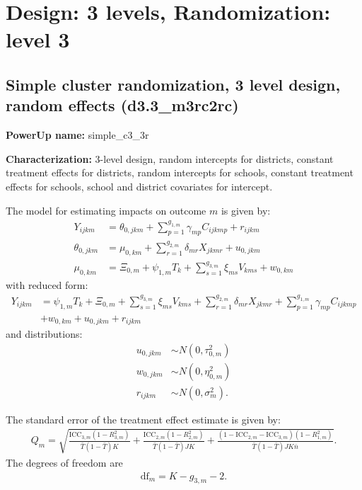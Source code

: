 \documentclass[12pt]{article}
\begin{document}
\section{Design: 3 levels, Randomization: level 3}


\subsection{Simple cluster randomization, 3 level design, random effects (d3.3\_m3rc2rc)}

\textbf{PowerUp name:} simple\_c3\_3r

\textbf{Characterization:} 3-level design, random intercepts for districts, constant treatment effects for districts, random intercepts for schools, constant treatment effects for schools, school and district covariates for intercept.

The model for estimating impacts on outcome $m$ is given by:
\begin{align}\label{eqn:bi12c_model}
Y_{ijkm} &=  \theta_{0,jkm} + \sum_{p=1}^{g_{1,m}} \gamma_{mp} C_{ijkmp} + r_{ijkm}\\
\nonumber \theta_{0,jkm} &= \mu_{0,km} + \sum_{r=1}^{g_{2,m}} \delta_{mr} X_{jkmr} + u_{0,jkm}\\
\nonumber \mu_{0,km}  &= \Xi_{0,m} + \psi_{1,m} T_{k} + \sum_{s=1}^{g_{3,m}} \xi_{ms} V_{kms} + w_{0,km}
\end{align}
with reduced form:
\begin{align}
Y_{ijkm} &= \psi_{1,m} T_{k} + \Xi_{0,m} + \sum_{s=1}^{g_{3,m}} \xi_{ms} V_{kms} + \sum_{r=1}^{g_{2,m}} \delta_{mr} X_{jkmr} + \sum_{p=1}^{g_{1,m}} \gamma_{mp} C_{ijkmp}\\
\nonumber &+ w_{0,km} + u_{0,jkm} + r_{ijkm}
\end{align}
and distributions:
\begin{align}
u_{0,jkm} &\sim N\left(0, \tau^2_{0,m}\right)\\
\nonumber w_{0,jkm} &\sim N\left(0, \eta^2_{0,m}\right)\\
\nonumber r_{ijkm} &\sim N\left(0, \sigma^2_m\right).
\end{align}

The standard error of the treatment effect estimate is given by:
\begin{align}
Q_m = \sqrt{
\frac{\text{ICC}_{3,m}(1 - R^2_{3,m})}{\bar{T}(1 - \bar{T}) K} +
\frac{\text{ICC}_{2,m}(1 - R^2_{2,m})}{\bar{T}(1 - \bar{T}) J K } +
\frac{(1-\text{ICC}_{2,m} - \text{ICC}_{3,m})(1-R^2_{1,m})}{\bar{T}(1 - \bar{T}) J K\bar{n}} }.\end{align}
The degrees of freedom are
\begin{align}\text{df}_m = K - g_{3,m} - 2.\end{align}
\end{document}

